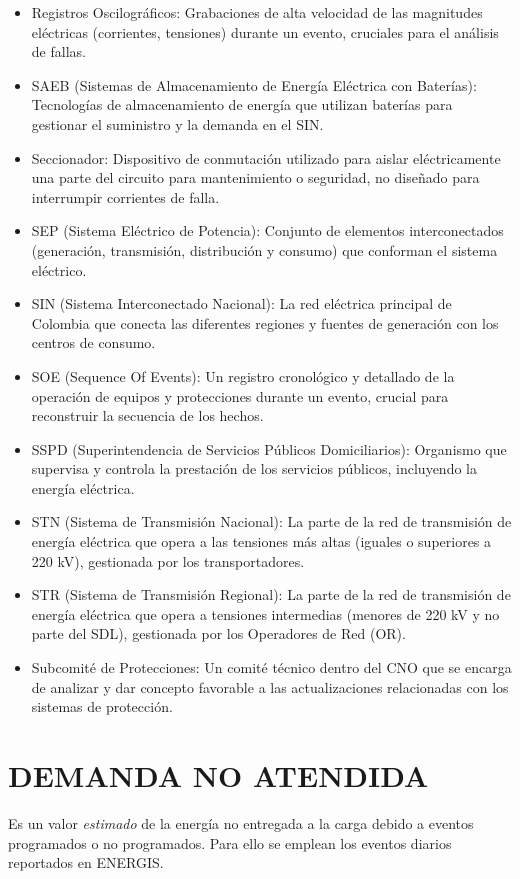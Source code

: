 \documentclass[a5paper]{book}%
\begin{document}
{\begin{itemize}
  \item Registros Oscilográficos: Grabaciones de alta velocidad de las magnitudes eléctricas (corrientes, tensiones) durante un evento, cruciales para el análisis de fallas.
  \item SAEB (Sistemas de Almacenamiento de Energía Eléctrica con Baterías): Tecnologías de almacenamiento de energía que utilizan baterías para gestionar el suministro y la demanda en el SIN.
  \item Seccionador: Dispositivo de conmutación utilizado para aislar eléctricamente una parte del circuito para mantenimiento o seguridad, no diseñado para interrumpir corrientes de falla.
  \item SEP (Sistema Eléctrico de Potencia): Conjunto de elementos interconectados (generación, transmisión, distribución y consumo) que conforman el sistema eléctrico.
  \item SIN (Sistema Interconectado Nacional): La red eléctrica principal de Colombia que conecta las diferentes regiones y fuentes de generación con los centros de consumo.
  \item SOE (Sequence Of Events): Un registro cronológico y detallado de la operación de equipos y protecciones durante un evento, crucial para reconstruir la secuencia de los hechos.
  \item SSPD (Superintendencia de Servicios Públicos Domiciliarios): Organismo que supervisa y controla la prestación de los servicios públicos, incluyendo la energía eléctrica.
  \item STN (Sistema de Transmisión Nacional): La parte de la red de transmisión de energía eléctrica que opera a las tensiones más altas (iguales o superiores a 220 kV), gestionada por los transportadores.
  \item STR (Sistema de Transmisión Regional): La parte de la red de transmisión de energía eléctrica que opera a tensiones intermedias (menores de 220 kV y no parte del SDL), gestionada por los Operadores de Red (OR).
  \item Subcomité de Protecciones: Un comité técnico dentro del CNO que se encarga de analizar y dar concepto favorable a las actualizaciones relacionadas con los sistemas de protección.
\end{itemize}}
  \section{DEMANDA NO ATENDIDA}

  Es un valor \textit{estimado} de la energía no entregada a la carga
  debido a eventos programados o no programados. Para ello se emplean
  los eventos diarios reportados en ENERGIS.\\\\
\end{document}
